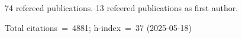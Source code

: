 74 refereed publications. 13 refeered publications as first author.

Total citations~=~4881; h-index~=~37 (2025-05-18)